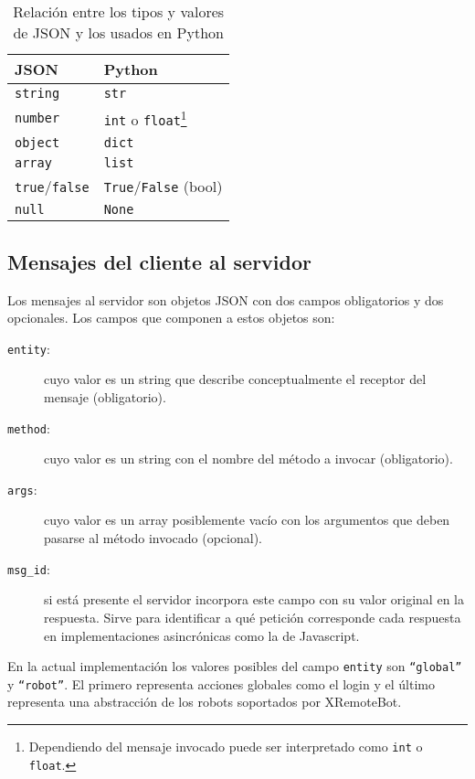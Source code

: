 \begin{table}
    \centering
    \begin{tabu}{l|l}
        JSON & Python \\
        \hline
        \texttt{string} & \texttt{str} \\
        \texttt{number} & \texttt{int} o \texttt{float}\footnote{Dependiendo
        del mensaje invocado
        puede ser interpretado como \texttt{int} o \texttt{float}.}\\
        \texttt{object} & \texttt{dict} \\
        \texttt{array}  & \texttt{list} \\
        \texttt{true}/\texttt{false} & \texttt{True}/\texttt{False} (bool) \\
        \texttt{null} & \texttt{None} \\
    \end{tabu}
    \caption{Relación entre los tipos y valores de JSON y los usados en
    Python}
    \label{tbl:rel_json_python}
\end{table}

\subsection{Mensajes del cliente al servidor}

Los mensajes al servidor son objetos JSON con dos campos obligatorios y dos
opcionales. Los campos que componen a estos objetos  son:

\begin{description}
    \item[\texttt{entity}:] cuyo valor es un string que describe conceptualmente
        el receptor del mensaje (obligatorio).
    \item[\texttt{method}:] cuyo valor es un string con el nombre del método a
        invocar (obligatorio).
    \item[\texttt{args}:] cuyo valor es un array posiblemente vacío con los
        argumentos que deben pasarse al método invocado (opcional).
    \item[\texttt{msg\_id}:] si está presente el servidor incorpora este
        campo con su valor original en la respuesta. Sirve para identificar a
        qué petición
        corresponde cada respuesta en implementaciones asincrónicas
        como la de Javascript.
\end{description}

En la actual implementación los valores posibles del campo \texttt{entity} son
\texttt{``global''} y \texttt{``robot''}. El primero
representa acciones globales como el login y el último representa una
abstracción de los robots soportados por XRemoteBot.

